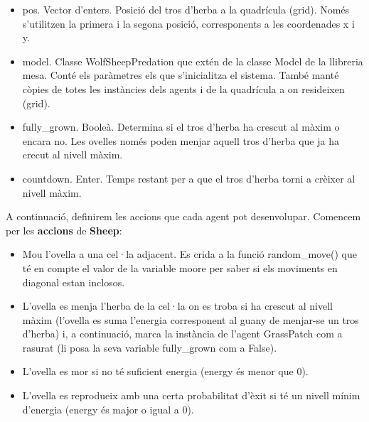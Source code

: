 \documentclass{article} %
\begin{document}
{	\begin{itemize}
		\item{
			{\selectfont\small pos}. Vector d'enters. Posició del tros d'herba a la quadrícula (grid). Només s'utilitzen la primera i la segona posició, corresponents a les coordenades x i y.
		}
		\item{
			{\selectfont\small model}. Classe {\selectfont\small WolfSheepPredation} que extén de la classe {\selectfont\small Model} de la llibreria mesa. Conté els paràmetres els que s'inicialitza el sistema. També manté còpies de totes les instàncies dels agents i de la quadrícula a on resideixen (grid).
		}
		\item{
			{\selectfont\small fully\_grown}. Booleà. Determina si el tros d'herba ha crescut al màxim o encara no. Les ovelles només poden menjar aquell tros d'herba que ja ha crecut al nivell màxim.
		}
		\item{
			{\selectfont\small countdown}. Enter. Temps restant per a que el tros d'herba torni a crèixer al nivell màxim.
		}
	\end{itemize}

	A continuació, definirem les accions que cada agent pot desenvolupar. Comencem per les \textbf{accions} de \textbf{Sheep}:

	\begin{itemize}
		\item Mou l'ovella a una cel·la adjacent. Es crida a la funció {\selectfont\small random\_move()} que té en compte el valor de la variable {\selectfont\small moore} per saber si els moviments en diagonal estan inclosos.
		\item L'ovella es menja l'herba de la cel·la on es troba si ha crescut al nivell màxim (l'ovella es suma l'energia corresponent al guany de menjar-se un tros d'herba) i, a continuació, marca la instància de l'agent {\selectfont\small GrassPatch} com a rasurat (li posa la seva variable {\selectfont\small fully\_grown} com a {\selectfont\small False}).
		\item L'ovella es mor si no té suficient energia ({\selectfont\small energy} és menor que 0).
		\item L'ovella es reprodueix amb una certa probabilitat d'èxit si té un nivell mínim d'energia ({\selectfont\small energy} és major o igual a 0).
	\end{itemize}

}
\end{document}
